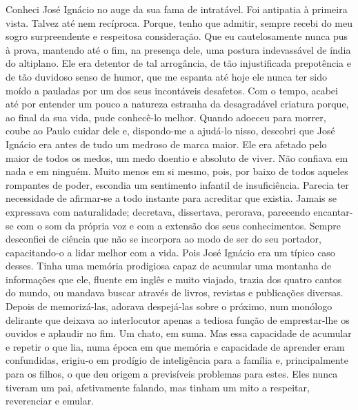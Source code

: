 Conheci José Ignácio no auge da sua fama de intratável.
Foi antipatia à primeira vista.
Talvez até nem recíproca.
Porque, tenho que admitir, sempre recebi do meu sogro surpreendente e respeitosa consideração.
Que eu cautelosamente nunca pus à prova, mantendo até o fim, na presença dele, uma postura indevassável de índia do altiplano.
Ele era detentor de tal arrogância, de tão injustificada prepotência e de tão duvidoso senso de humor, que me espanta até hoje ele nunca ter sido moído a pauladas por um dos seus incontáveis desafetos.
Com o tempo, acabei até por entender um pouco a natureza estranha da desagradável criatura porque, ao final da sua vida, pude conhecê-lo melhor.
Quando adoeceu para morrer, coube ao Paulo cuidar dele e, dispondo-me a ajudá-lo nisso, descobri que José Ignácio era antes de tudo um medroso de marca maior.
Ele era afetado pelo maior de todos os medos, um medo doentio e absoluto de viver.
Não confiava em nada e em ninguém.
Muito menos em si mesmo, pois, por baixo de todos aqueles rompantes de poder, escondia um sentimento infantil de insuficiência.
Parecia ter necessidade de afirmar-se a todo instante para acreditar que existia.
Jamais se expressava com naturalidade; decretava, dissertava, perorava, parecendo encantar-se com o som da própria voz e com a extensão dos seus conhecimentos.
Sempre desconfiei de ciência que não se incorpora ao modo de ser do seu portador, capacitando-o a lidar melhor com a vida.
Pois José Ignácio era um típico caso desses.
Tinha uma memória prodigiosa capaz de acumular uma montanha de informações que ele, fluente em inglês e muito viajado, trazia dos quatro cantos do mundo, ou mandava buscar através de livros, revistas e publicações diversas.
Depois de memorizá-las, adorava despejá-las sobre o próximo, num monólogo delirante que deixava ao interlocutor apenas a tediosa função de emprestar-lhe os ouvidos e aplaudir no fim.
Um chato, em suma.
Mas essa capacidade de acumular e repetir o que lia, numa época em que memória e capacidade de aprender eram confundidas, erigiu-o em prodígio de inteligência para a família e, principalmente para os filhos, o que deu origem a previsíveis problemas para estes.
Eles nunca tiveram um pai, afetivamente falando, mas tinham um mito a respeitar, reverenciar e emular.

